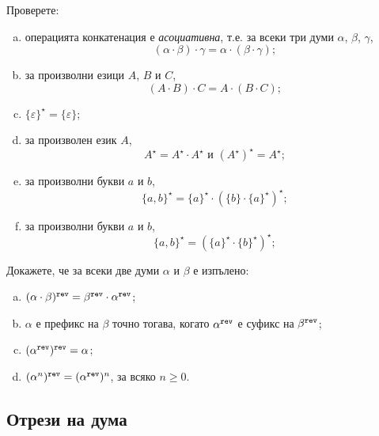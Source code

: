 

\begin{extra}
\begin{problem}
  Проверете:
  \begin{enumerate}[a)]
  \item 
    операцията конкатенация е {\em асоциативна}, т.е. за всеки три думи $\alpha$, $\beta$, $\gamma$,
    \[(\alpha\cdot\beta)\cdot\gamma = \alpha\cdot(\beta\cdot\gamma);\]
  \item
    за произволни езици $A$, $B$ и $C$, 
    \[(A\cdot B)\cdot C = A\cdot (B\cdot C);\]
  \item
    $\{\varepsilon\}^\star = \{\varepsilon\}$;
  \item
    за произволен език $A$,
    \[A^\star = A^\star\cdot A^\star\text{ и }(A^\star)^\star = A^\star;\]
  \item
    за произволни букви $a$ и $b$,
    \[\{a,b\}^\star = \{a\}^\star\cdot(\{b\}\cdot\{a\}^\star)^\star;\]
  \item
    за произволни букви $a$ и $b$,
    \[\{a,b\}^\star = (\{a\}^\star\cdot \{b\}^\star)^\star;\]
  \end{enumerate}
\end{problem}

\begin{problem}
  Докажете, че за всеки две думи $\alpha$ и $\beta$ е изпълено:
  \begin{enumerate}[a)]
  \item 
    $(\alpha\cdot\beta)^{\texttt{rev}} = \beta^{\texttt{rev}}\cdot\alpha^{\texttt{rev}}$;
  \item
    $\alpha$ е префикс на $\beta$ точно тогава, когато $\alpha^{\texttt{rev}}$ е суфикс на $\beta^{\texttt{rev}}$;
  \item
    $(\alpha^{\texttt{rev}})^{\texttt{rev}} = \alpha$;
  \item
    $(\alpha^n)^{\texttt{rev}} = (\alpha^{\texttt{rev}})^n$, за всяко $n \geq 0$.
  \end{enumerate}
\end{problem}
\end{extra}

\subsection*{Отрези на дума}\label{sect:intro:slices}

